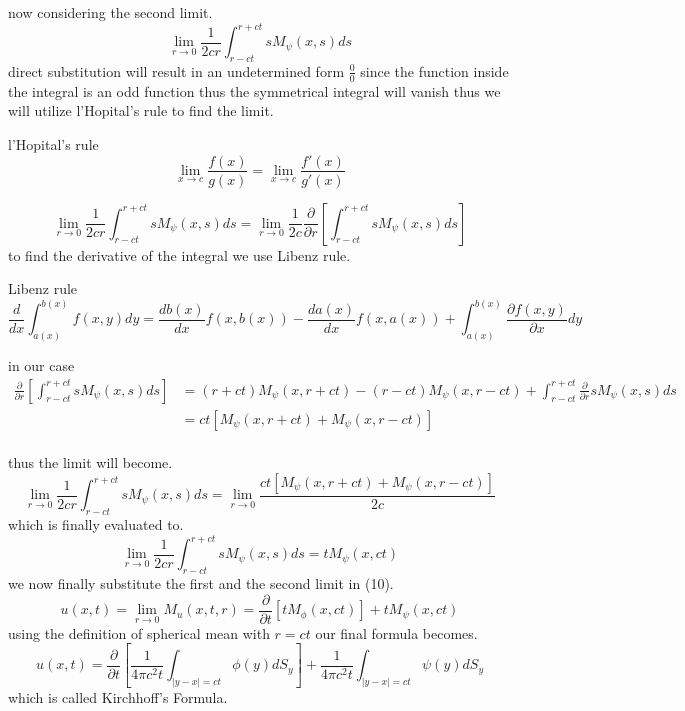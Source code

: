 \documentclass[]{article}
\begin{document}
now considering the second limit.
\[
    \lim_{r\to 0}\frac{1}{2cr}\int_{r-ct}^{r+ct} sM_\psi(x,s)ds    
\]
direct substitution will result in an undetermined form $\frac{0}{0}$ since the function inside the integral is an odd function thus the symmetrical integral will vanish thus we will utilize l'Hopital's rule to find the limit.
\begin{enrichment*}{l'Hopital's rule}
    \[
        \lim_{{x \to c}} \frac{{f(x)}}{{g(x)}} = \lim_{{x \to c}} \frac{{f'(x)}}{{g'(x)}}    
    \]
\end{enrichment*}
\[
    \lim_{r\to 0}\frac{1}{2cr}\int_{r-ct}^{r+ct} sM_\psi(x,s)ds = \lim_{r\to 0}\frac{1}{2c}\frac{\partial}{\partial r}\left[\int_{r-ct}^{r+ct} sM_\psi(x,s)ds\right]    
\]
to find the derivative of the integral we use Libenz rule.
\begin{enrichment*}{Libenz rule}
    \[
        \frac{d}{dx}\int_{a(x)}^{b(x)} f(x,y)dy = \frac{db(x)}{dx}f(x,b(x))-\frac{da(x)}{dx}f(x,a(x)) + \int_{a(x)}^{b(x)} \frac{\partial f(x,y)}{\partial x} dy    
    \]
\end{enrichment*}
in our case
\begin{align*}
\frac{\partial}{\partial r}\left[\int_{r-ct}^{r+ct} sM_\psi(x,s)ds\right] &= (r+ct)M_\psi(x,r+ct) - (r-ct)M_\psi(x,r-ct) + \int_{r-ct}^{r+ct} \frac{\partial}{\partial r} sM_\psi(x,s)ds
\\
 &= ct[M_\psi(x,r+ct)+M_\psi(x,r-ct)]
\end{align*}
\\
thus the limit will become.
\[
    \lim_{r\to 0}\frac{1}{2cr}\int_{r-ct}^{r+ct} sM_\psi(x,s)ds = \lim_{r\to 0}\frac{ct[M_\psi(x,r+ct)+M_\psi(x,r-ct)]}{2c}    
\]
which is finally evaluated to.
\[
    \lim_{r\to 0}\frac{1}{2cr}\int_{r-ct}^{r+ct} sM_\psi(x,s)ds = tM_\psi(x,ct)    
\]
we now finally substitute the first and the second limit in (10).
\[
    u(x,t) = \lim_{r\to 0} M_u(x,t,r) = \frac{\partial}{\partial t}[tM_\phi(x,ct)] + tM_\psi(x,ct)    
\]
using the definition of spherical mean with $r=ct$ our final formula becomes.
\[
    u(x,t) = \frac{\partial}{\partial t}\left[\frac{1}{4\pi c^2 t}\int_{|y-x|=ct}\phi(y)dS_y\right] + \frac{1}{4\pi c^2 t}\int_{|y-x|=ct}\psi(y)dS_y    
\]
which is called Kirchhoff's Formula.
\end{document}
